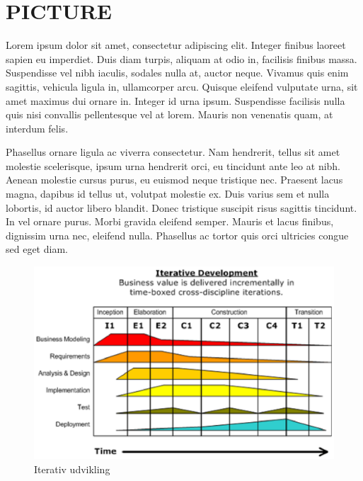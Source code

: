 \cfoot{\page\textbackslash \totalp} %
\chapter{PICTURE}
Lorem ipsum dolor sit amet, consectetur adipiscing elit. Integer finibus laoreet sapien eu imperdiet. Duis diam turpis, aliquam at odio in, facilisis finibus massa. Suspendisse vel nibh iaculis, sodales nulla at, auctor neque. Vivamus quis enim sagittis, vehicula ligula in, ullamcorper arcu. Quisque eleifend vulputate urna, sit amet maximus dui ornare in. Integer id urna ipsum. Suspendisse facilisis nulla quis nisi convallis pellentesque vel at lorem. Mauris non venenatis quam, at interdum felis.

Phasellus ornare ligula ac viverra consectetur. Nam hendrerit, tellus sit amet molestie scelerisque, ipsum urna hendrerit orci, eu tincidunt ante leo at nibh. Aenean molestie cursus purus, eu euismod neque tristique nec. Praesent lacus magna, dapibus id tellus ut, volutpat molestie ex. Duis varius sem et nulla lobortis, id auctor libero blandit. Donec tristique suscipit risus sagittis tincidunt. In vel ornare purus. Morbi gravida eleifend semper. Mauris et lacus finibus, dignissim urna nec, eleifend nulla. Phasellus ac tortor quis orci ultricies congue sed eget diam.

\begin{center}
\begin{figure}
\includegraphics[trim = 0mm 100mm 100mm 500mm]{./UPmetode.eps}
\caption{Iterativ udvikling}
\end{figure}
\end{center}